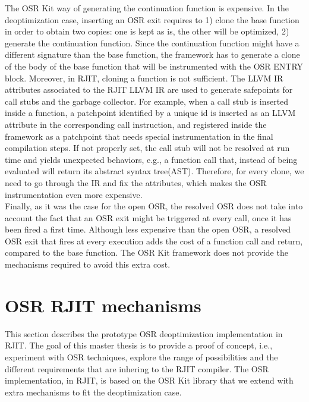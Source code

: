 The OSR Kit way of generating the continuation function is expensive.
In the deoptimization case, inserting an OSR exit requires to 1) clone the base function in order to obtain two copies: one is kept as is, the other will be optimized, 2) generate the continuation function. 
Since the continuation function might have a different signature than the base function, the framework has to generate a clone of the body of the base function that will be instrumented with the OSR ENTRY block.
Moreover, in RJIT, cloning a function is not sufficient.
The LLVM IR attributes\cite{llvmAttribute} associated to the RJIT LLVM IR are used to generate safepoints for call stubs and the garbage collector.
For example, when a call stub is inserted inside a function, a patchpoint identified by a unique id is inserted as an LLVM attribute in the corresponding call instruction, and registered inside the framework as a patchpoint that needs special instrumentation in the final compilation steps.
If not properly set, the call stub will not be resolved at run time and yields unexpected behaviors, e.g., a function call that, instead of being evaluated will return its abstract syntax tree(AST).
Therefore, for every clone, we need to go through the IR and fix the attributes, which makes the OSR instrumentation even more expensive.\\

Finally, as it was the case for the open OSR, the resolved OSR does not take into account the fact that an OSR exit might be triggered at every call, once it has been fired a first time.
Although less expensive than the open OSR, a resolved OSR exit that fires at every execution adds the cost of a function call and return, compared to the base function.
The OSR Kit framework does not provide the mechanisms required to avoid this extra cost.\\

\section{OSR RJIT mechanisms}
This section describes the prototype OSR deoptimization implementation in RJIT. 
The goal of this master thesis is to provide a proof of concept, i.e., experiment with OSR techniques, explore the range of possibilities and the different requirements that are inhering to the RJIT compiler.
The OSR implementation, in RJIT, is based on the OSR Kit\cite{OSRKit} library that we extend with extra mechanisms to fit the deoptimization case.  
